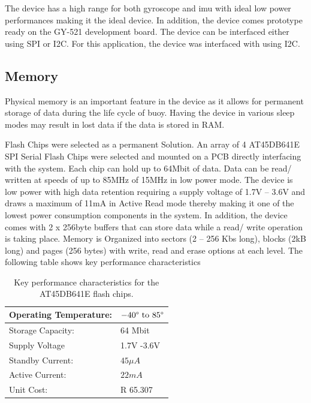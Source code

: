 The device has a high range for both gyroscope and imu with ideal low power performances making it the ideal device. In addition, the device comes prototype ready on the GY-521 development board. The device can be interfaced either using SPI or I2C. For this application, the device was interfaced with using I2C.

\subsection{Memory}

Physical memory is an important feature in the device as it allows for permanent storage of data during the life cycle of buoy. Having the device in various sleep modes may result in lost data if the data is stored in RAM.

Flash Chips were selected as a permanent Solution. An array of 4 AT45DB641E SPI Serial Flash Chips were selected and mounted on a PCB directly interfacing with the system. Each chip can hold up to 64Mbit of data. Data can be read/ written at speeds of up to 85MHz of 15MHz in low power mode. The device is low power with high data retention requiring a supply voltage of 1.7V – 3.6V and draws a maximum of 11mA in Active Read mode thereby making it one of the lowest power consumption components in the system. In addition, the device comes with 2 x 256byte buffers that can store data while a read/ write operation is taking place. Memory is Organized into sectors (2 – 256 Kbs long), blocks (2kB long) and pages (256 bytes) with write, read and erase options at each level. The following table shows key performance characteristics

\begin{table}[H]
	\centering
	\caption{Key performance characteristics for the AT45DB641E flash chips.}
	\begin{tabular}{|l|l|}
		\hline
		Operating Temperature:  & $ -40\degree \text{ to }85 \degree$ \\
		\hline
		Storage Capacity: & 64 Mbit \\
		\hline
		Supply Voltage    & 1.7V -3.6V\\
		\hline
		Standby Current: & $45\mu A$ \\
		\hline
		Active Current:  & $22mA$ \\
		\hline
		Unit Cost:       & R 65.307 \footnotemark\\
		\hline
	\end{tabular}
	
	\label{tab:flash_specs}
\end{table}

